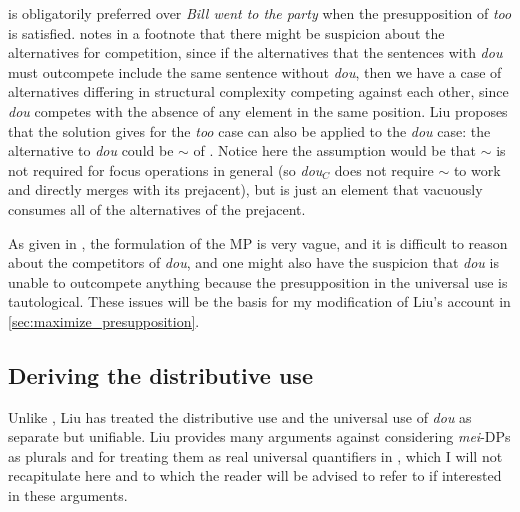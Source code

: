 \documentclass[12pt]{article}
\begin{document}
\Last is obligatorily preferred over \emph{Bill went to the party} when the presupposition of \emph{too} is satisfied.
\citet{liuPragmaticExplanationMeidou2021} notes in a footnote that there might be suspicion about the alternatives for competition, since if the alternatives that the sentences with \emph{dou} must outcompete include the same sentence without \emph{dou}, then we have a case of alternatives differing in structural complexity competing against each other, since \emph{dou} competes with the absence of any element in the same position.
Liu proposes that the solution \citet{singhModularityLocalityInterpretation2008} gives for the \emph{too} case can also be applied to the \emph{dou} case: the alternative to \emph{dou} could be \(\sim\) of \citet{roothTheoryFocusInterpretation1992}.
Notice here the assumption would be that \(\sim\) is not required for focus operations in general (so \emph{dou}\(_C\) does not require \(\sim\) to work and directly merges with its prejacent), but is just an element that vacuously consumes all of the alternatives of the prejacent.

As given in \citet{liuPragmaticExplanationMeidou2021}, the formulation of the MP is very vague, and it is difficult to reason about the competitors of \emph{dou}, and one might also have the suspicion that \emph{dou} is unable to outcompete anything because the presupposition in the universal use is tautological. 
These issues will be the basis for my modification of Liu's account in \cref{sec:maximize_presupposition}.



\subsection{Deriving the distributive use}
\label{sub:deriving_the_distributor_use}
Unlike \citet{xiangFunctionAlternationsMandarin2020}, Liu has treated the distributive use and the universal use of \emph{dou} as separate but unifiable. 
Liu provides many arguments against considering \emph{mei}-DPs as plurals and for treating them as real universal quantifiers in \citet{liuPragmaticExplanationMeidou2021}, which I will not recapitulate here and to which the reader will be advised to refer to if interested in these arguments.
\end{document}
